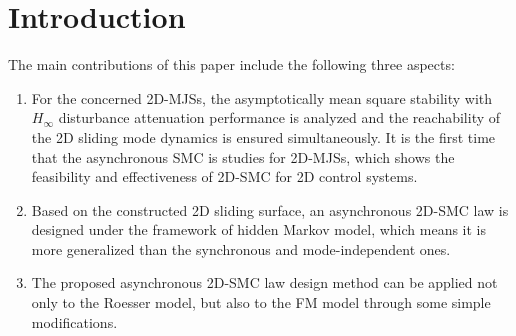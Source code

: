 \documentclass[conference]{IEEEtran}
\begin{document}
\section{Introduction}
	The main contributions of this paper include the following three aspects:
	\begin{enumerate}
		\item  For the concerned 2D-MJSs, the asymptotically mean square stability with $H_{\infty}$ disturbance attenuation  performance is analyzed and the reachability of the 2D sliding mode dynamics is ensured simultaneously. It is the first time that the asynchronous SMC is studies for 2D-MJSs, which shows the feasibility and effectiveness of 2D-SMC for 2D control systems.
		\item   Based on the constructed 2D sliding surface, an asynchronous 2D-SMC law is designed under the framework of hidden Markov model, which means it is more generalized than the synchronous and mode-independent ones.
		\item  The proposed asynchronous 2D-SMC law design method can be applied not only to the Roesser model, but also to the FM model through some simple modifications.
	\end{enumerate}
\end{document}

